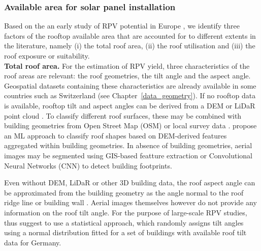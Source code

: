 \subsubsection{Available area for solar panel installation}

Based on the an early study of RPV potential in Europe \cite{iea_potential_2002}, we identify three factors of the rooftop available area that are accounted for to different extents in the literature, namely (i) the total roof area, (ii) the roof utilisation and (iii) the roof exposure or suitability. 
\\

\textbf{Total roof area.} For the estimation of RPV yield, three characteristics of the roof areas are relevant: the roof geometries, the tilt angle and the aspect angle. Geospatial datasets containing these characteristics are already available in some countries such as Switzerland (see Chapter~\ref{data_geometry}).
If no rooftop data is available, rooftop tilt and aspect angles can be derived from a DEM \cite{ramirez_camargo_spatio-temporal_2015} or LiDaR point cloud \cite{buffat_feature-aware_2016,nguyen_incorporating_2012}.
To classify different roof surfaces, these may be combined with building geometries from Open Street Map (OSM) or local survey data \cite{ramirez_camargo_spatio-temporal_2015}.
\citet{mohajeri_city-scale_2018} propose an ML approach to classify roof shapes based on DEM-derived features aggregated within building geometries.
In absence of building geometries, aerial images may be segmented using GIS-based featture extraction \cite{wiginton_quantifying_2010} or Convolutional Neural Networks (CNN) \cite{zhao_object-based_2017} to detect building footprints.

Even without DEM, LiDaR or other 3D building data, the roof aspect angle can be approximated from the building geometry as the angle normal to the roof ridge line or building wall \cite{mainzer_assessment_2017}. 
Aerial images themselves however do not provide any information on the roof tilt angle.
For the purpose of large-scale RPV studies, \citet{mainzer_assessment_2017} thus suggest to use a statistical approach, which randomly assigns tilt angles using a normal distribution fitted for a set of buildings with available roof tilt data for Germany.

